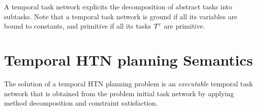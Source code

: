 \documentclass[letterpaper]{article} %
\newtheorem{example}{Example}
\newcommand{\duration}{\text{\it duration}}
\newcommand{\tstart}{\text{\it start}}
\newcommand{\tend}{\text{\it end}}
\begin{document}
A temporal task network explicits the decomposition of abstract tasks into subtasks. %
Note that a temporal task network is ground if all its variables are bound to constants, and primitive if all its tasks ${\cal{T}}'$ are primitive.


\begin{comment}
\begin{example}[${\cal{C}}_o$ constraints]
 For instance, the temporal ordering constraint $\tstart(t_1) < \tend(t_2)$ belonging to ${\cal{C}}_o$ expresses that the start of the task $t_1$ must occur strictly  before the end of the task $t_2$.
  \end{example}

\begin{example}[${\cal{C}}_v$ constraints]
\ldots 
  \end{example}

\begin{example}[${\cal{C}}_d$ constraints]
  For instance, let $t_1, t_2 \in {\cal{I}}$ and $w$ a task network; the durative constraints $\duration(t_1) < \duration(t_2)$ expresses that the duration of $t_1$ must be strictly smaller that $t_2$, and the constraint $\duration(w) \geq \duration(t_1) * \duration(t_2)$ expresses that the duration of $w$ is greater or equal to the product of the durations of $t_1$ and $t_2$. Durative constraints can be expressed in terms of start and end events of a task. For instance the previous constraint $\duration(t_1) < \duration(t_2)$ can be expressed as  $\tend(t_1) - \tstart(t_1) < \tend(t_2) - \tstart(t_2)$.
  \end{example}

\begin{example}[${\cal{C}}_t$ constraints]
\ldots
  \end{example}

\end{comment}

%
 \section{Temporal HTN planning Semantics}
 \label{THTN}

 The solution of a temporal HTN planning problem is an {\it executable} temporal task network that is obtained from the problem initial task network by applying method decomposition and constraint satisfaction.
\end{document}
